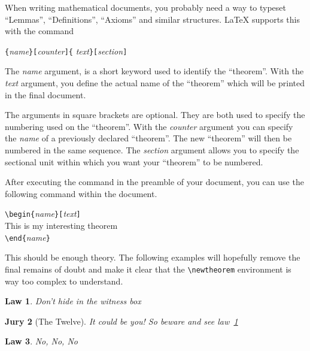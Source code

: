 When writing mathematical documents, you probably need a way to
typeset ``Lemmas'', ``Definitions'', ``Axioms'' and similar
structures. \LaTeX{} supports this with the command
\begin{command}
\verb|{|\emph{name}\verb|}[|\emph{counter}\verb|]{|%
         \emph{text}\verb|}[|\emph{section}\verb|]|
\end{command}
The \emph{name} argument, is a short keyword used to identify the
``theorem''. With the \emph{text} argument, you define the actual name
of the ``theorem'' which will be printed in the final document.

The arguments in square brackets are optional. They are both used to
specify the numbering used on the ``theorem''. With the \emph{counter}
argument you can specify the \emph{name} of a previously declared
``theorem''. The new ``theorem'' will then be numbered in the same
sequence.  The \emph{section} argument allows you to specify the
sectional unit within which you want your ``theorem'' to be numbered.

After executing the  command in the preamble of your
document, you can use the following command within the document.

\begin{code}
\verb|\begin{|\emph{name}\verb|}[|\emph{text}\verb|]|\\
This is my interesting theorem\\
\verb|\end{|\emph{name}\verb|}|     
\end{code}

This should be enough theory. The following examples will hopefully
remove the final remains of doubt and make it clear that the
\verb|\newtheorem| environment is way too complex to understand.

\begin{example}
\newtheorem{law}{Law}
\newtheorem{jury}[law]{Jury}
\begin{law} \label{law:box}
Don't hide in the witness box
\end{law}
\begin{jury}[The Twelve]
It could be you! So beware and
see law~\ref{law:box}\end{jury}
\begin{law}No, No, No\end{law}
\end{example}

